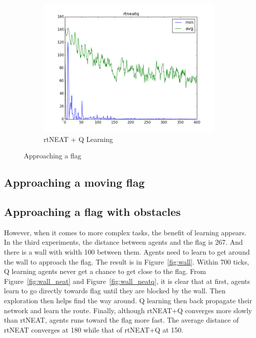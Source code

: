\documentclass[letterpaper]{article}
\begin{document}
\begin{figure}[ht]
\begin{subfigure}{0.7\columnwidth}
  \includegraphics[width=\columnwidth]{flag_rtneatq.png}
  \caption{rtNEAT + Q Learning}
  \label{fig:flag_neatq}
\end{subfigure}
\caption{Approaching a flag}
\label{fig:flag}
\end{figure}

\subsection{Approaching a moving flag}


\subsection{Approaching a flag with obstacles}
However, when it comes to more complex tasks, the benefit of learning appears. In the third experiments, the distance between agents and the flag is 267. And there is a wall with width 100 between them. Agents need to learn to get around the wall to approach the flag. The result is in Figure~\ref{fig:wall}. Within 700 ticks, Q learning agents never get a chance to get close to the flag. From Figure~\ref{fig:wall_neat} and Figure~\ref{fig:wall_neatq}, it is clear that at first, agents learn to go directly towards flag until they are blocked by the wall. Then exploration then helps find the way around. Q learning then back propagate their network and learn the route. Finally, although rtNEAT+Q converges more slowly than rtNEAT, agents runs toward the flag more fast. The average distance of rtNEAT converges at 180 while that of rtNEAT+Q at 150. 
\end{document}
